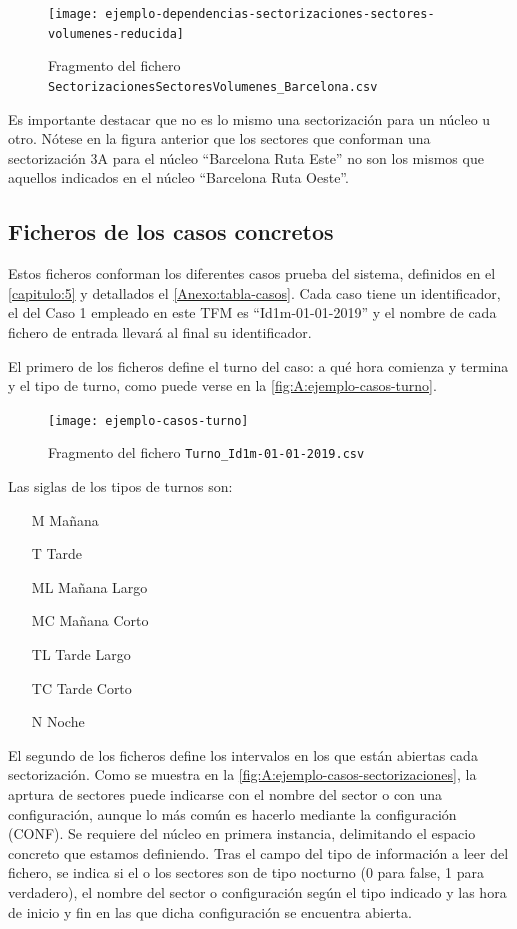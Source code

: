 \begin{figure}[h]
	\centering
	\texttt{[image: ejemplo-dependencias-sectorizaciones-sectores-volumenes-reducida]}
	\caption{Fragmento del fichero \texttt{SectorizacionesSectoresVolumenes\_Barcelona.csv}}
	\label{fig:A:ejemplo-dependencias-sectorizaciones-sectores-volumenes}
\end{figure}

Es importante destacar que no es lo mismo una sectorización para un núcleo u otro. Nótese en la figura anterior que los sectores que conforman una sectorización 3A para el núcleo ``Barcelona Ruta Este'' no son los mismos que aquellos indicados en el núcleo ``Barcelona Ruta Oeste''.

\subsection{Ficheros de los casos concretos}

Estos ficheros conforman los diferentes casos prueba del sistema, definidos en el \autoref{capitulo:5} y detallados el \autoref{Anexo:tabla-casos}. Cada caso tiene un identificador, el del Caso 1 empleado en este TFM es ``Id1m-01-01-2019'' y el nombre de cada fichero de entrada llevará al final su identificador.

El primero de los ficheros define el turno del caso: a qué hora comienza y termina y el tipo de turno, como puede verse en la \autoref{fig:A:ejemplo-casos-turno}.

\begin{figure}[h]
	\centering
	\texttt{[image: ejemplo-casos-turno]}
	\caption{Fragmento del fichero \texttt{Turno\_Id1m-01-01-2019.csv}}
	\label{fig:A:ejemplo-casos-turno}
\end{figure}

Las siglas de los tipos de turnos son:

\begin{enumerate}[align=left]
	\item[M] Mañana
	\item[T] Tarde 
	\item[ML] Mañana Largo
	\item[MC] Mañana Corto
	\item[TL] Tarde Largo
	\item[TC] Tarde Corto
	\item[N] Noche
\end{enumerate}


El segundo de los ficheros define los intervalos en los que están abiertas cada sectorización. Como se muestra en la \autoref{fig:A:ejemplo-casos-sectorizaciones}, la aprtura de sectores puede indicarse con el nombre del sector o con una configuración, aunque lo más común es hacerlo mediante la configuración (CONF). Se requiere del núcleo en primera instancia, delimitando el espacio concreto que estamos definiendo. Tras el campo del tipo de información a leer del fichero, se indica si el o los sectores son de tipo nocturno (0 para false, 1 para verdadero), el nombre del sector o configuración según el tipo indicado y las hora de inicio y fin en las que dicha configuración se encuentra abierta.

